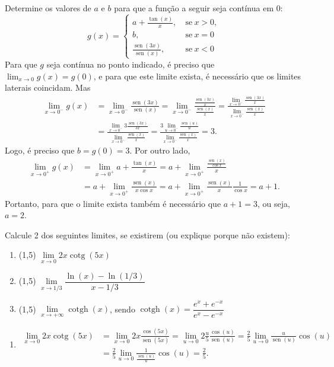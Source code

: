 \documentclass[12pt,a4paper]{article}
\newcommand*\sen{\operatorname{sen}}
\newcommand*\cotg{\operatorname{cotg}}
\newcommand*\cotgh{\operatorname{cotgh}}
\begin{document}
\begin{ExerciseList}
\Exercise[title={2,0}] Determine os valores de $a$ e $b$ para que a função a seguir seja contínua em 0:
\[
g(x) =
\begin{cases}
a + \frac{ \tan(x) }{ x },\ & \text{se}\ x > 0,\\
b,\ &\text{se}\ x = 0\\
\frac{ \sen(3x) }{ \sen(x) },\ &\text{se}\ x < 0
\end{cases}
\]
\Answer Para que $g$ seja contínua no ponto indicado, é preciso que $\lim_{x \to 0} g(x) = g(0)$, e para que este limite exista, é necessário que os limites laterais coincidam. Mas
\begin{align*}
  \lim_{x \to 0^-} g(x)
& = \lim_{x \to 0^-} \frac{ \sen(3x) }{ \sen(x) }
= \lim_{x \to 0^-} \frac{ \frac{ \sen(3x) }{x} }{ \frac{ \sen(x) }{x} }
= \frac{ \lim_{x \to 0^-} \frac{ \sen(3x) }{x} }
       { \lim_{x \to 0^-} \frac{ \sen( x) }{x} }\\
&= \frac{ \lim_{x \to 0^-} 3 \frac{ \sen(3x) }{3x} }
       { \lim_{x \to 0^-} \frac{ \sen( x) }{x} }
= \frac{ 3 \lim_{u \to 0^-} \frac{ \sen(u) }{u} }
       { \lim_{x \to 0^-} \frac{ \sen( x) }{x} }
= 3.
\end{align*}
Logo, é preciso que $b = g(0) = 3$. Por outro lado,
\begin{align*}
    \lim_{x \to 0^+} g(x)
& = \lim_{x \to 0^+} a + \frac{ \tan(x) }{ x }
  = a + \lim_{x \to 0^+} \frac{ \frac{ \sen(x) }{ \cos{x} } }{ x }\\
& = a + \lim_{x \to 0^+} \frac{ \sen(x) }{ x \cos{x} }
  = a + \lim_{x \to 0^+} \frac{ \sen(x) }{ x }\frac{1}{ \cos{x} }
  = a + 1.
\end{align*}
Portanto, para que o limite exista também é necessário que $a+1 = 3$, ou seja, $a=2$.

\Exercise[title={3,0}] Calcule 2 dos seguintes limites, se existirem (ou explique porque não existem):
\begin{enumerate}
\item (1,5) $\lim\limits_{x\to 0} 2x \cotg(5x)$
\item (1,5) $\lim\limits_{x\to 1/3} \dfrac{\ln(x) - \ln(1/3)}{x-1/3}$
\item (1,5) $\lim\limits_{x\to +\infty} \cotgh(x)$, sendo $\cotgh(x) = \dfrac{e^x+e^{-x}}{e^x-e^{-x}}$
\end{enumerate}
\Answer
\begin{enumerate}
\item
\begin{align*}
  \lim\limits_{x\to 0} 2x \cotg(5x)
&= \lim\limits_{x\to 0} 2x \frac{ \cos(5x) }{ \sen(5x) }
= \lim\limits_{u\to 0} 2\frac{u}{5} \frac{ \cos(u) }{ \sen(u) }
= \frac{2}{5} \lim\limits_{u\to 0} \frac{ u }{ \sen(u) }\cos(u)\\
&= \frac{2}{5} \lim\limits_{u\to 0} \frac{ 1 }{  \frac{ \sen(u) }{ u } }\cos(u)
= \frac{2}{5}.
\end{align*}


\end{enumerate}
\end{ExerciseList}
\end{document}
